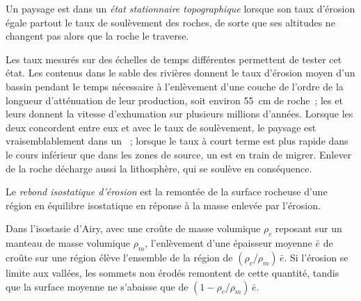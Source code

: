 \begin{definition}\label{def:b3:quantitative-geomorphology:steady-state}
Un paysage est dans un \emph{état stationnaire topographique}
lorsque son taux d'érosion égale partout le taux de soulèvement des roches, de sorte que
ses altitudes ne changent pas alors que la roche le traverse.
\end{definition}

Les taux mesurés sur des échelles de temps différentes permettent de tester cet état. Les 
contenus dans le sable des rivières donnent le taux d'érosion moyen d'un bassin pendant le temps
nécessaire à l'enlèvement d'une couche de l'ordre de la longueur d'atténuation de leur
production, soit environ \qty{55}{cm} de roche~; les  et leurs  donnent
la vitesse d'exhumation sur plusieurs millions d'années. Lorsque les deux concordent entre eux
et avec le taux de soulèvement, le paysage est vraisemblablement dans un ~; lorsque
le taux à court terme est plus rapide dans le cours inférieur que dans les zones de source,
un  est en train de migrer. Enlever de la roche décharge aussi la
lithosphère, qui se soulève en conséquence.

\begin{definition}\label{def:b3:quantitative-geomorphology:rebound}
Le \emph{rebond isostatique d'érosion} est
la remontée de la surface rocheuse d'une région en équilibre isostatique en
réponse à la masse enlevée par l'érosion.
\end{definition}

\begin{proposition}\label{prop:b3:quantitative-geomorphology:rebound}
Dans l'isostasie d'Airy, avec une croûte de masse volumique $\rho_c$ reposant sur un manteau
de masse volumique $\rho_m$, l'enlèvement d'une épaisseur moyenne $\bar e$ de croûte sur une région élève
l'ensemble de la région de $(\rho_c/\rho_m)\,\bar e$. Si l'érosion se limite
aux vallées, les sommets non érodés remontent de cette quantité, tandis que la surface moyenne
ne s'abaisse que de $(1 - \rho_c/\rho_m)\,\bar e$.
\end{proposition}

